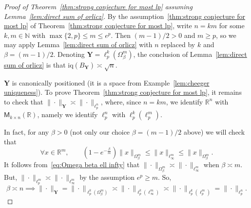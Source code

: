 \documentclass[11pt,reqno]{amsart}
\renewcommand{\le}{\leqslant}
\renewcommand{\ge}{\geqslant}
\newcommand{\Y}{\mathbf Y}
\newcommand{\R}{\mathbb R}
\theoremstyle{remark}
\newcommand{\iq}{\mathrm{iq}}
\newcommand{\M}{\mathsf{M}}
\newcommand{\N}{\mathbb N}
\renewcommand{\1}{\mathbf 1}
\begin{document}
\begin{proof}[Proof of Theorem~\ref{thm:strong conjecture for most lp} assuming Lemma~\ref{lem:direct sum of orlicz}] By the assumption~\eqref{thm:strong conjecture for most lp} of Theorem~\ref{thm:strong conjecture for most lp},  write $n=km$ for some $k,m\in \N$ with $\max\{2,p\}\le m\le e^p$. Then $(m-1)/2>0$ and $m\ge p$, so we may apply  Lemma~\ref{lem:direct sum of orlicz} with $n$ replaced by $k$ and $\beta=(m-1)/2$. Denoting $\Y=\ell_p^k(\Omega_\beta^m)$, the conclusion of Lemma~\ref{lem:direct sum of orlicz} is that $\iq(B_\Y)\asymp \sqrt{n}$.

$\Y$ is canonically positioned (it is a space from Example~\ref{lem:cheeger uniqueness}). To prove Theorem~\ref{thm:strong conjecture for most lp}, it remains to check that $\|\cdot\|_\Y\asymp \|\cdot\|_{\ell_p^n}$, where, since $n=km$, we identify $\R^n$ with $\M_{k\times n}(\R)$, namely we identify $\ell_p^n$ with $\ell_p^k(\ell_p^m)$.


In fact,  for any $\beta>0$ (not only our choice $\beta=(m-1)/2$ above) we will check that
\begin{equation}\label{eq:Omega beta ell infty}
\forall x\in \R^m,\qquad  \left(1-e^{-\frac{\beta}{m}}\right)\|x\|_{\Omega_{\beta}^m}\le  \|x\|_{\ell_\infty^m}\le \|x\|_{\Omega_{\beta}^m}.
\end{equation}
It follows from~\eqref{eq:Omega beta ell infty} that  $\|\cdot\|_{\Omega_\beta^m}\asymp \|\cdot\|_{\ell_\infty^m}$ when $\beta\asymp m$. But, $\|\cdot\|_{\ell_p^m}\asymp \|\cdot\|_{\ell_\infty^m}$ by the assumption $e^p\ge m$. So,
$$
\beta\asymp n\implies  \|\cdot\|_\Y=\|\cdot\|_{\ell_p^k(\Omega_\beta^m)} \asymp \|\cdot\|_{\ell_p^k(\ell_\infty^m)}\asymp \|\cdot\|_{\ell_p^k(\ell_p^m)}=\|\cdot\|_{\ell_p^n}.
$$



\end{proof}
\end{document}
